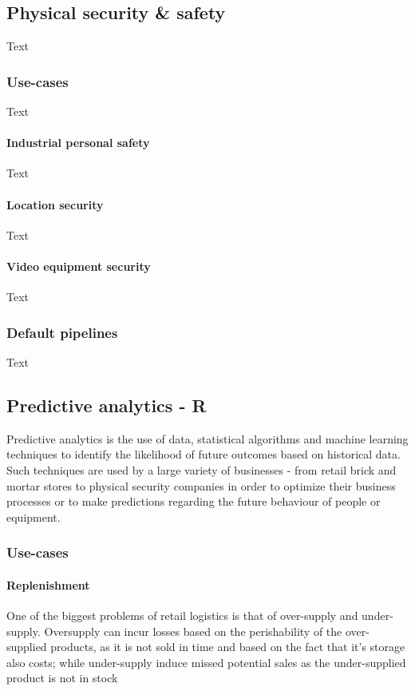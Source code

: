 \documentclass{article}
\begin{document}
\subsection{Physical security \& safety}
Text

\subsubsection{Use-cases}
Text
\paragraph{Industrial personal safety}
Text
\paragraph{Location security}
Text
\paragraph{Video equipment security}
Text

\subsubsection{Default pipelines}
Text

\subsection{Predictive analytics - R}
Predictive analytics is the use of data, statistical algorithms and machine learning techniques to identify the likelihood of future outcomes based on historical data. Such techniques are used by a large variety of businesses - from retail brick and mortar stores to physical security companies in order to optimize their business processes or to make predictions regarding the future behaviour of people or equipment.

\subsubsection{Use-cases}

\paragraph{Replenishment}
One of the biggest problems of retail logistics is that of over-supply and under-supply. Oversupply can incur losses based on the perishability of the over-supplied products, as it is not sold in time and based on the fact that it's storage also costs; while under-supply induce missed potential sales as the under-supplied product is not in stock
\end{document}
